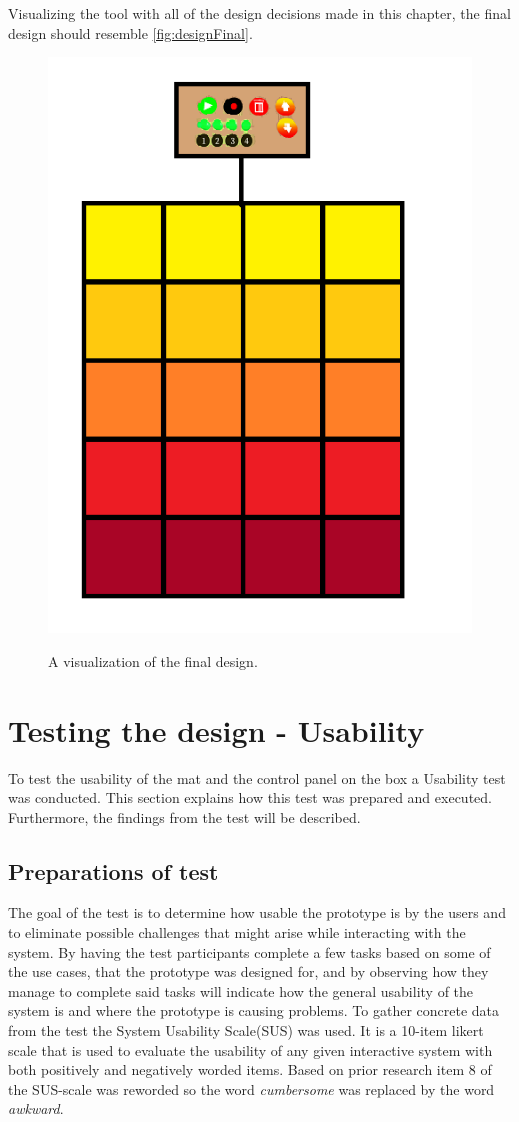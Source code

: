 Visualizing the tool with all of the design decisions made in this chapter, the final design should resemble \autoref{fig:designFinal}.  
\begin{figure}[H]
	\centering
	\includegraphics[width=0.7\linewidth]{figure/Design/DesignFinal}
	\label{fig:designFinal}
	\caption{A visualization of the final design.}	
\end{figure}













\section{Testing the design - Usability}
To test the usability of the mat and the control panel on the box a Usability test was conducted. This section explains how this test was prepared and executed. Furthermore, the findings from the test will be described.

\subsection{Preparations of test}
The goal of the test is to determine how usable the prototype is by the users and to eliminate possible challenges that might arise while interacting with the system. By having the test participants complete a few tasks based on some of the use cases, that the prototype was designed for, and by observing how they manage to complete said tasks will indicate how the general usability of the system is and where the prototype is causing problems. To gather concrete data from the test the System Usability Scale(SUS)\cite{susScale} was used. It is a 10-item likert scale that is used to evaluate the usability of any given interactive system with both positively and negatively worded items. Based on prior research item 8 of the SUS-scale was reworded so the word \textit{cumbersome} was replaced by the word \textit{awkward}\cite{susScale}.


